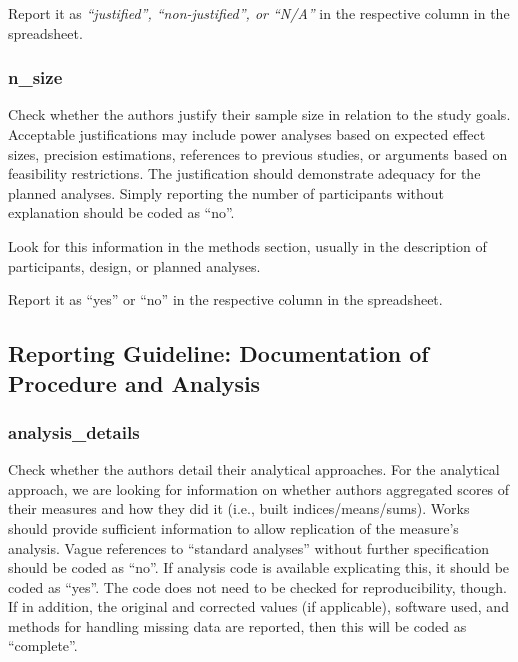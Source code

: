 {Report it as \textit{``justified'', ``non-justified'', or ``N/A''} in the respective column in the spreadsheet.

\subsubsection*{n\_size}
\label{size}
Check whether the authors justify their sample size in relation to the study goals. Acceptable justifications may include power analyses based on expected effect sizes, precision estimations, references to previous studies, or arguments based on feasibility restrictions. The justification should demonstrate adequacy for the planned analyses. Simply reporting the number of participants without explanation should be coded as ``no''.

Look for this information in the methods section, usually in the description of participants, design, or planned analyses.

Report it as ``yes'' or ``no'' in the respective column in the spreadsheet.


\subsection*{Reporting Guideline: Documentation of Procedure and Analysis}

\subsubsection*{analysis\_details}
\label{analysis}
Check whether the authors detail their analytical approaches. For the analytical approach, we are looking for information on whether authors aggregated scores of their measures and how they did it (i.e., built indices/means/sums). Works should provide sufficient information to allow replication of the measure's analysis. Vague references to ``standard analyses'' without further specification should be coded as ``no''. If analysis code is available explicating this, it should be coded as ``yes''. The code does not need to be checked for reproducibility, though. If in addition, the original and corrected values (if applicable), software used, and methods for handling missing data are reported, then this will be coded as ``complete''.

}
